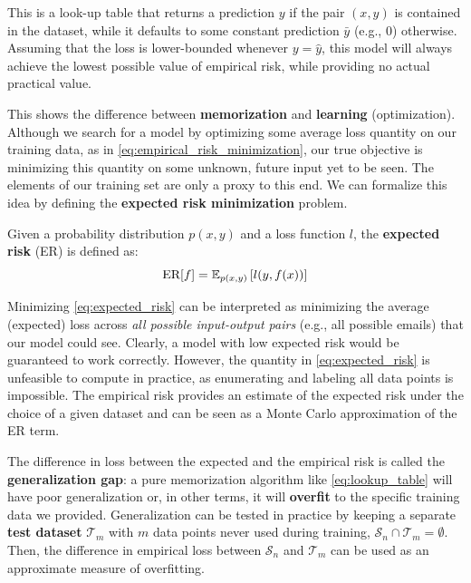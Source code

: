 \vspace{1em}
This is a look-up table that returns a prediction $y$ if the pair $(x,y)$ is contained in the dataset, while it defaults to some constant prediction $\bar{y}$ (e.g., 0) otherwise. Assuming that the loss is lower-bounded whenever $y = \hat{y}$, this model will always achieve the lowest possible value of empirical risk, while providing no actual practical value. 

This shows the difference between \textbf{memorization} and \textbf{learning} (optimization). Although we search for a model by optimizing some average loss quantity on our training data, as in \eqref{eq:empirical_risk_minimization}, our true objective is minimizing this quantity on some unknown, future input yet to be seen. The elements of our training set are only a proxy to this end. We can formalize this idea by defining the \textbf{expected risk minimization} problem.

\begin{definition}
Given a probability distribution $p(x,y)$ and a loss function $l$, the \textbf{expected risk} (ER) is defined as:
%
\begin{equation}
\textnormal{ER}[f] = \mathbb{E}_{p(x,y)}\left[ l(y, f(x)) \right]
\label{eq:expected_risk}
\end{equation}
\end{definition}

Minimizing \eqref{eq:expected_risk} can be interpreted as minimizing the average (expected) loss across \textit{all possible input-output pairs} (e.g., all possible emails) that our model could see. Clearly, a model with low expected risk would be guaranteed to work correctly. However, the quantity in \eqref{eq:expected_risk} is unfeasible to compute in practice, as enumerating and labeling all data points is impossible. The empirical risk provides an estimate of the expected risk under the choice of a given dataset and can be seen as a Monte Carlo approximation of the ER term.

The difference in loss between the expected and the empirical risk is called the \textbf{generalization gap}: a pure memorization algorithm like \eqref{eq:lookup_table} will have poor generalization or, in other terms, it will \textbf{overfit} to the specific training data we provided. Generalization can be tested in practice by keeping a separate \textbf{test dataset} $\mathcal{T}_m$ with $m$ data points never used during training, $\mathcal{S}_n \cap \mathcal{T}_m = \emptyset$. Then, the difference in empirical loss between $\mathcal{S}_n$ and $\mathcal{T}_m$ can be used as an approximate measure of overfitting.

